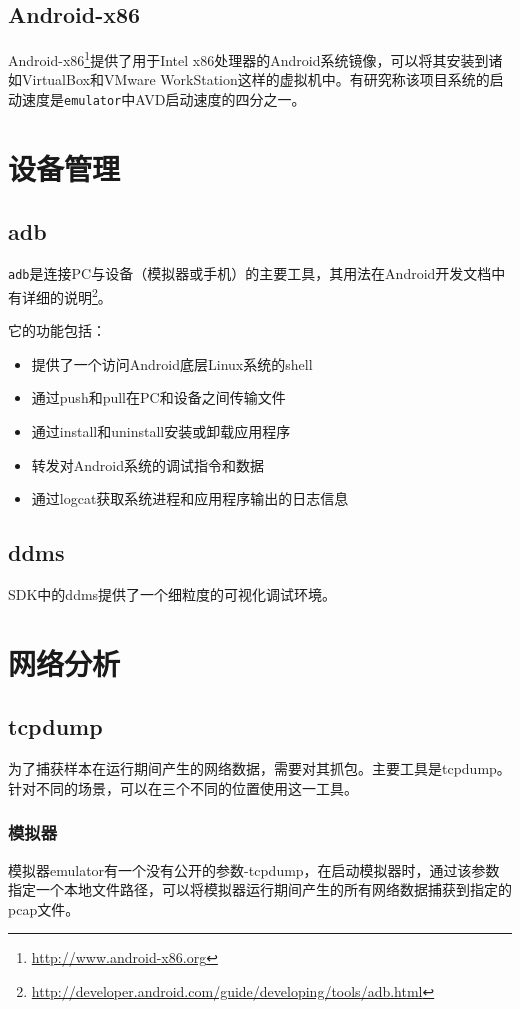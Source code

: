 \subsection{Android-x86}
Android-x86\footnote{\url{http://www.android-x86.org}}提供了用于Intel x86处理器的Android系统镜像，可以将其安装到诸如VirtualBox和VMware WorkStation这样的虚拟机中。有研究称该项目系统的启动速度是\lstinline!emulator!中AVD启动速度的四分之一。

\section{设备管理}
\subsection{adb}
\lstinline!adb!是连接PC与设备（模拟器或手机）的主要工具，其用法在Android开发文档中有详细的说明\footnote{\url{http://developer.android.com/guide/developing/tools/adb.html}}。

它的功能包括：
\begin{itemize}
\item 提供了一个访问Android底层Linux系统的shell
\item 通过push和pull在PC和设备之间传输文件
\item 通过install和uninstall安装或卸载应用程序
\item 转发对Android系统的调试指令和数据
\item 通过logcat获取系统进程和应用程序输出的日志信息
\end{itemize}

\subsection{ddms}
SDK中的ddms提供了一个细粒度的可视化调试环境。
\section{网络分析}
\subsection{tcpdump}
为了捕获样本在运行期间产生的网络数据，需要对其抓包。主要工具是tcpdump。针对不同的场景，可以在三个不同的位置使用这一工具。
\subsubsection{模拟器}
模拟器emulator有一个没有公开的参数-tcpdump，在启动模拟器时，通过该参数指定一个本地文件路径，可以将模拟器运行期间产生的所有网络数据捕获到指定的pcap文件。
